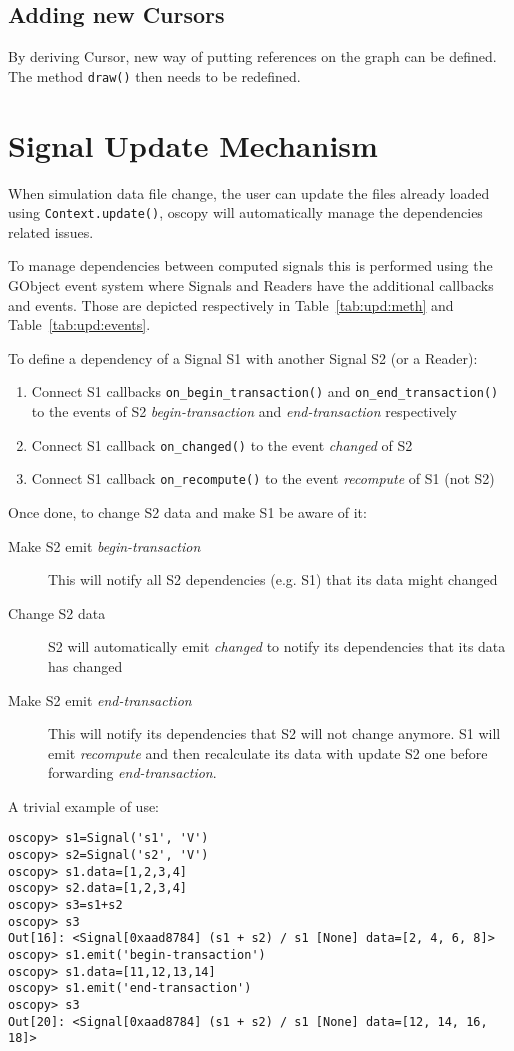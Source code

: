 \documentclass[a4paper,11pt]{article}
\newcommand{\meth}[1]{\texttt{#1()}}
\newcommand{\cls}[1]{\textsf{#1}}
\newcommand{\event}[1]{\textit{#1}}
\newcommand{\cursor}{\cls{Cursor}}
\begin{document}
\subsection{Adding new Cursors}
By deriving \cursor, new way of putting references on the graph can be defined.
The method \meth{draw} then needs to be redefined.

\section{Signal Update Mechanism}
When simulation data file change, the user can update the files already loaded using \meth{Context.update}, oscopy will automatically manage the dependencies related issues.

To manage dependencies between computed signals this is performed using the GObject event system where Signals and Readers have the additional callbacks and events.
Those are depicted respectively in Table~\ref{tab:upd:meth} and Table~\ref{tab:upd:events}.

To define a dependency of a Signal S1 with another Signal S2 (or a Reader):
\begin{enumerate}
\item Connect S1 callbacks \meth{on\_begin\_transaction} and \meth{on\_end\_transaction} to the events of S2 \event{begin-transaction} and \event{end-transaction} respectively
\item Connect S1 callback \meth{on\_changed} to the event \event{changed} of S2
\item Connect S1 callback \meth{on\_recompute} to the event \event{recompute} of S1 (not S2)
\end{enumerate}
Once done, to change S2 data and make S1 be aware of it:
\begin{description}
\item [Make S2 emit \event{begin-transaction}] This will notify all S2 dependencies (e.g. S1) that its data might changed
\item [Change S2 data] S2 will automatically emit \event{changed} to notify its dependencies that its data has changed
\item[Make S2 emit \event{end-transaction}] This will notify its dependencies that S2 will not change anymore. S1 will emit \event{recompute} and then recalculate its data with update S2 one before forwarding \event{end-transaction}.
\end{description}
A trivial example of use:
\begin{verbatim}
oscopy> s1=Signal('s1', 'V')
oscopy> s2=Signal('s2', 'V')
oscopy> s1.data=[1,2,3,4]
oscopy> s2.data=[1,2,3,4]
oscopy> s3=s1+s2
oscopy> s3
Out[16]: <Signal[0xaad8784] (s1 + s2) / s1 [None] data=[2, 4, 6, 8]>
oscopy> s1.emit('begin-transaction')
oscopy> s1.data=[11,12,13,14]
oscopy> s1.emit('end-transaction')
oscopy> s3
Out[20]: <Signal[0xaad8784] (s1 + s2) / s1 [None] data=[12, 14, 16, 18]>
\end{verbatim}
\end{document}
